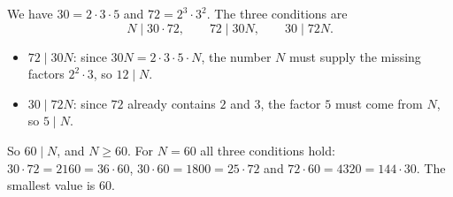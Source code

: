 We have $30=2\cdot3\cdot5$ and $72=2^3\cdot3^2$. The three conditions are
\[N\mid30\cdot72,\qquad72\mid30N,\qquad30\mid72N.\]
\begin{itemize}
\item $72\mid30N$: since $30N=2\cdot3\cdot5\cdot N$, the number $N$ must supply the missing factors $2^2\cdot3$, so $12\mid N$.
\item $30\mid72N$: since $72$ already contains $2$ and $3$, the factor $5$ must come from $N$, so $5\mid N$.
\end{itemize}
So $60\mid N$, and $N\ge60$. For $N=60$ all three conditions hold: $30\cdot72=2160=36\cdot60$, $30\cdot60=1800=25\cdot72$ and $72\cdot60=4320=144\cdot30$. The smallest value is $\boxed{60}$.
